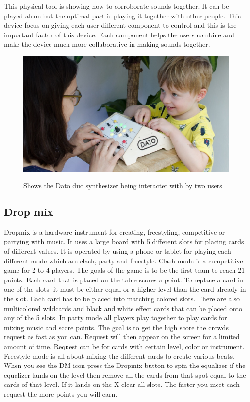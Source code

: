 This physical tool is showing how to corroborate sounds together. It can be played alone but the optimal part is playing it together with other people. This device focus on giving each user different component to control and this is the important factor of this device. Each component helps the users combine and make the device much more collaborative in making sounds together. \cite{Datoduo}
\begin{figure}[H]
	\centering
	\includegraphics[width=0.7\linewidth]{figure/Analysis/datoduo}
	\label{fig:datoduo}
	\caption{Shows the Dato duo synthesizer being interactet with by two users \cite{Datoduo}}
\end{figure}

\subsection{Drop mix}
Dropmix is a hardware instrument for creating, freestyling, competitive or partying with music. It uses a large board with 5 different slots for placing cards of different values. It is operated by using a phone or tablet for playing each different mode which are clash, party and freestyle. Clash mode is a competitive game for 2 to 4 players. The goals of the game is to be the first team to reach 21 points. Each card that is placed on the table scores a point. To replace a card in one of the slots, it must be either equal or a higher level than the card already in the slot. Each card has to be placed into matching colored slots. There are also multicolored wildcards and black and white effect cards that can be placed onto any of the 5 slots. In party mode all players play together to play cards for mixing music and score points. The goal is to get the high score the crowds request as fast as you can. Request will then appear on the screen for a limited amount of time. Request can be for cards with certain level, color or instrument. Freestyle mode is all about mixing the different cards to create various beats. When you see the DM icon press the Dropmix button to spin the equalizer if the equalizer lands on the level then remove all the cards from that spot equal to the cards of that level. If it lands on the X clear all slots. The faster you meet each request the more points you will earn. 

